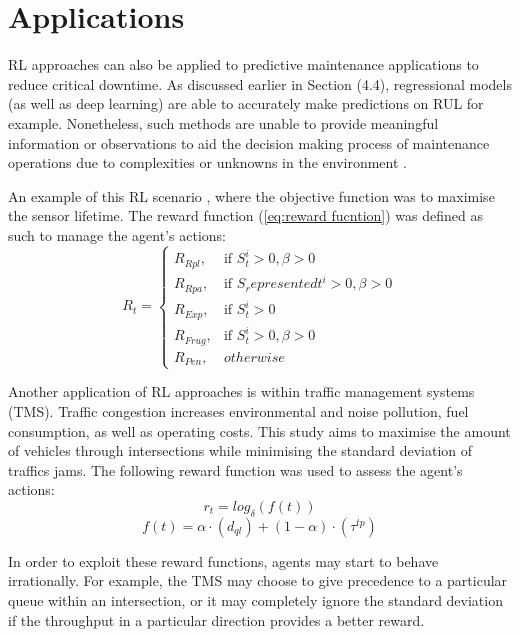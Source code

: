 \section{Applications}
RL approaches can also be applied to predictive maintenance applications to reduce critical downtime. 
As discussed earlier in Section (4.4), regressional models (as well as deep learning) are able to accurately make predictions on RUL for example. 
Nonetheless, such methods are unable to provide meaningful information or observations to aid the decision making process of maintenance operations due to complexities or unknowns in the environment \cite{9221098}.

An example of this RL scenario \cite{9221098}, where the objective function was to maximise the sensor lifetime.
The reward function (\ref{eq:reward fucntion}) was defined as such to manage the agent's actions:
\begin{equation}
    \label{eq:reward fucntion}
    R_t = \begin{cases}
        R_{Rpl}, & \text{if } S_t^i > 0, \beta > 0\\
        R_{Rpa}, & \text{if } S_representedt^i > 0, \beta > 0\\
        R_{Exp}, & \text{if } S_t^i > 0\\
        R_{Frug}, & \text{if } S_t^i > 0, \beta > 0\\
        R_{Pen}, & otherwise
    \end{cases}
\end{equation}

Another application of RL approaches is within traffic management systems (TMS). 
Traffic congestion increases environmental and noise pollution, fuel consumption, as well as operating costs.
This study \cite{JOO2020324} aims to maximise the amount of vehicles through intersections while minimising the standard deviation of traffics jams.
The following reward function was used to assess the agent's actions:
\begin{equation}
    r_t = log_\delta(f(t))
\end{equation}
\begin{equation}
    f(t) = \alpha \cdot (d_{ql}) + (1 - \alpha)\cdot(\tau^{tp})
\end{equation}

In order to exploit these reward functions, agents may start to behave irrationally. 
For example, the TMS may choose to give precedence to a particular queue within an intersection, or it may completely ignore the standard deviation if the throughput in a particular direction provides a better reward.

